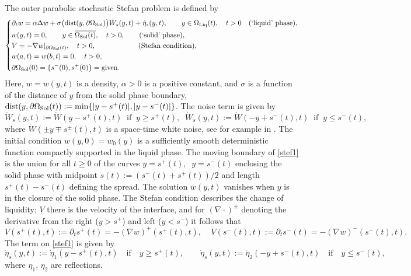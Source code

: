 \documentclass[reqno]{amsart}
\numberwithin{equation}{section}
\begin{document}
The outer parabolic stochastic Stefan problem is defined by
\begin{equation}\label{stef1}\left\{
\begin{aligned}
&\partial_t w=\alpha\Delta w +\sigma\big({\rm dist}(y,\partial
\Omega_{\rm{Sol}})\big) \dot{W}_s(y,t)+\dot{\eta}_s(y,t), \qquad y\in\Omega_{\rm{Liq}}(t),\quad t>0\quad \mbox{(`liquid' phase)},
\\
&w(y,t)=0,\qquad y\in \overline{\Omega_{\rm{Sol}}(t)},\quad t>0 , \qquad \mbox{(`solid' phase)},
\\
&V=-\nabla w|_{\partial\Omega_{\rm{Sol}}(t)},\quad  t>0 , \qquad\qquad\qquad \mbox{(Stefan condition)},
\\
&w(a,t)=w(b,t)=0,\quad t>0 ,
\\
&\partial \Omega_{\rm{Sol}}(0)=\{s^-(0),s^+(0)\}={\rm given}.
\end{aligned}
\right.
\end{equation}
Here, $w=w(y,t)$ is a density, $\alpha> 0$ is a positive constant, and $\sigma$ is a function of the distance of $y$ from the solid phase boundary, $ {\rm dist}(y,\partial\Omega_{\rm{Sol}}(t)):=\min\{|y-s^+(t)|,|y-s^-(t)|\}$. The noise term is given by
\begin{equation*}\label{noi1}
\dot{W}_s(y,t) := \dot{W}(y-s^+(t),t) \;\; \text{if}\;\;y\geq
s^+(t), \;\;
\dot{W}_s(y,t):=\dot{W}(-y+s^-(t),t) \;\; \text{if}\;\;y\leq s^-(t),
\end{equation*}
where $\dot{W}(\pm y\mp s^\pm(t),t)$ is a space-time white noise,
see for example in \cite{Walsh,DQS}. The initial condition $w(y,0)=w_0(y) $ is a sufficiently smooth deterministic function compactly supported in the liquid phase. The moving boundary of \eqref{stef1} is the union for all $t\geq 0$ of the curves $y=s^+(t),\;\; y=s^-(t)$ enclosing the solid phase with midpoint $s(t):=(s^-(t)+s^+(t))/2$ and length $s^+(t)-s^{-}(t)$ defining the spread. The solution $w(y,t)$ vanishes when $y$ is in the closure of the solid phase. The Stefan condition describes the
change of liquidity; $V$ there is the velocity of the interface, and for $(\nabla \cdot )^\pm$ denoting the derivative from the right ($y> s^+$) and left ($y<s^-$) it follows that
$$
V(s^+(t),t):=\partial_t s^+(t)=-(\nabla w)^+(s^+(t),t),\;\;\;\;
V(s^-(t),t):=\partial_t s^-(t)=-(\nabla w)^-(s^-(t),t).$$ %
The term on \eqref{stef1} is given by
$$\dot{\eta}_s(y,t) := \dot{\eta}_1(y-s^+(t),t)\quad \text{if}\quad y\geq s^+(t), \qquad
\dot{\eta}_s(y,t):=\dot{\eta}_2(-y+s^-(t),t) \quad \text{if}\quad y\leq s^-(t),$$
where $\eta_1$, $\eta_2$ are reflections.
\end{document}
